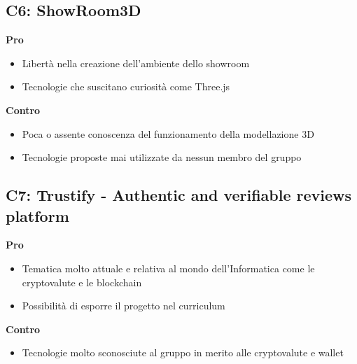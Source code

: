 \subsection{C6: ShowRoom3D}
\textbf{Pro}
\begin{itemize}[leftmargin=30pt, rightmargin=2cm]
    \item Libertà nella creazione dell’ambiente dello showroom
    \item Tecnologie che suscitano curiosità come Three.js
\end{itemize}
\textbf{Contro}
\begin{itemize}
    \item Poca o assente conoscenza del funzionamento della modellazione 3D
    \item Tecnologie proposte mai utilizzate da nessun membro del gruppo
\end{itemize}

\subsection{C7: Trustify - Authentic and verifiable reviews platform}
\textbf{Pro}
\begin{itemize}[leftmargin=30pt, rightmargin=2cm]
    \item Tematica molto attuale e relativa al mondo dell’Informatica come le cryptovalute e le blockchain
    \item Possibilità di esporre il progetto nel curriculum
\end{itemize}
\textbf{Contro}
\begin{itemize}
    \item Tecnologie molto sconosciute al gruppo in merito alle cryptovalute e wallet
\end{itemize}

